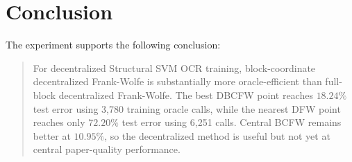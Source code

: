 \documentclass[11pt,a4paper]{article}
\begin{document}
\section{Conclusion}

The experiment supports the following conclusion:

\begin{quote}
For decentralized Structural SVM OCR training, block-coordinate decentralized Frank-Wolfe is substantially more oracle-efficient than full-block decentralized Frank-Wolfe. The best DBCFW point reaches \(18.24\%\) test error using 3,780 training oracle calls, while the nearest DFW point reaches only \(72.20\%\) test error using 6,251 calls. Central BCFW remains better at \(10.95\%\), so the decentralized method is useful but not yet at central paper-quality performance.
\end{quote}



\end{document}
